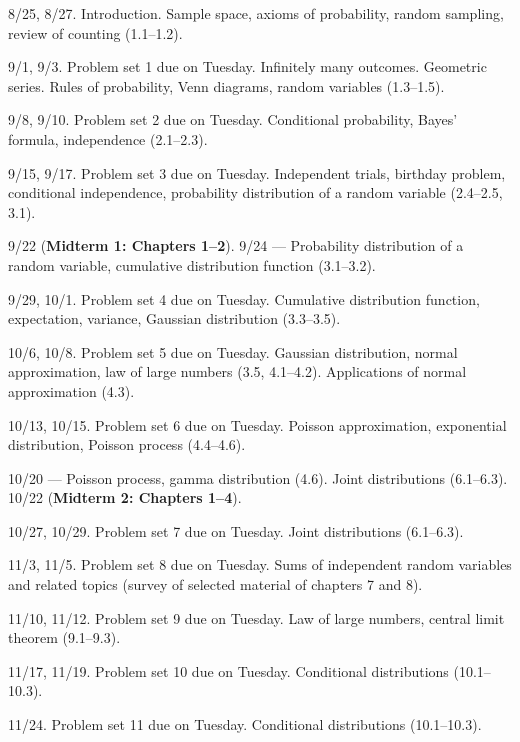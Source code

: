 \documentclass[oneside,11pt]{amsart}
\begin{document}
\bigskip

\begin{enumerate}[\bf{}{[}week 1{]}]
	\item 8/25, 8/27. Introduction. Sample space, axioms of probability, random sampling, review of counting (1.1--1.2).
	\item 9/1, 9/3. Problem set 1 due on Tuesday.
		Infinitely many outcomes. Geometric series. 
		Rules of probability, Venn diagrams, random variables
		(1.3--1.5).
	\item 9/8, 9/10. Problem set 2 due on Tuesday.
		Conditional probability, Bayes' formula, independence
		(2.1--2.3).
	\item 9/15, 9/17. Problem set 3 due on Tuesday.
		Independent trials, birthday problem, conditional independence, 
		probability distribution of a random variable
		(2.4--2.5, 3.1).
	\item 9/22 (\textbf{Midterm 1: Chapters 1--2}). 9/24 --- 
		Probability distribution of a random variable,
		cumulative distribution function (3.1--3.2).
	\item 9/29, 10/1. Problem set 4 due on Tuesday.
		Cumulative distribution function, 
		expectation, variance, 
		Gaussian distribution
		(3.3--3.5).
	\item 10/6, 10/8. Problem set 5 due on Tuesday.
		Gaussian distribution, normal approximation,
		law of large numbers
		(3.5, 4.1--4.2).
		Applications of normal approximation (4.3).
	\item 10/13, 10/15. Problem set 6 due on Tuesday.
		Poisson approximation, exponential distribution, Poisson process
		(4.4--4.6).
	\item 10/20 --- Poisson process, gamma distribution (4.6). 
		Joint distributions (6.1--6.3).
		10/22 (\textbf{Midterm 2: Chapters 1--4}).
	\item 10/27, 10/29.
		Problem set 7 due on Tuesday.
		Joint distributions (6.1--6.3).
	\item 11/3, 11/5. Problem set 8 due on Tuesday.
		Sums of independent random variables and related topics (survey of 
		selected material of chapters 7 and 8).
	\item 11/10, 11/12. Problem set 9 due on Tuesday.
		Law of large numbers, central limit theorem (9.1--9.3).
	\item 11/17, 11/19. Problem set 10 due on Tuesday.
		Conditional distributions (10.1--10.3).
	\item 11/24. Problem set 11 due on Tuesday.
		Conditional distributions (10.1--10.3).
\end{enumerate}
\end{document}

